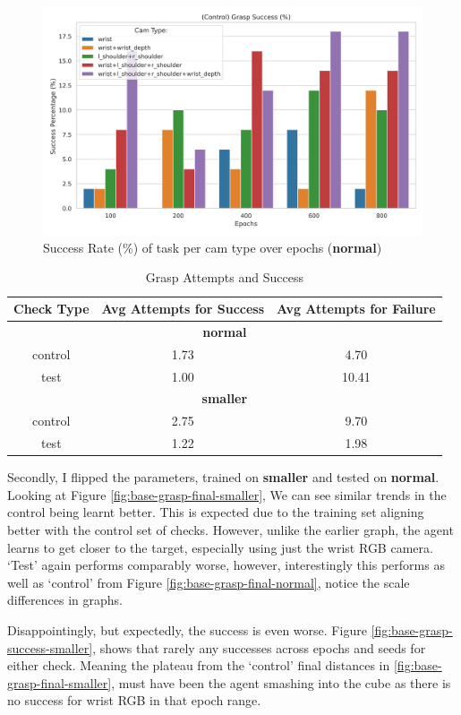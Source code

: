 \begin{figure}[H]
  \centering
  \includegraphics[width=0.4\linewidth]{assets/evaluation/baseline/base-grasp-control-success-cams-epochs.png}
  \caption{Success Rate (\%) of task per cam type over epochs (\textbf{normal})}\label{fig:base-grasp-control-success-normal}
\end{figure}

\begin{table}[ht]
\centering
  \begin{tabular}{||c c c||}
  \hline
  Check Type & Avg Attempts for Success & Avg Attempts for Failure\\
  \hline
  \hline
  \multicolumn{3}{||c||}{\textbf{normal}} \\
  control & 1.73 & 4.70 \\
  test    & 1.00 & 10.41 \\
  \hline
  \multicolumn{3}{||c||}{\textbf{smaller}} \\
  control & 2.75 & 9.70 \\
  test    & 1.22 & 1.98 \\
  \hline
  \end{tabular}\caption{Grasp Attempts and Success}\label{tab:baseline-grasp-attempts}
\end{table}

Secondly, I flipped the parameters, trained on \textbf{smaller} and tested on \textbf{normal}. Looking at Figure \ref{fig:base-grasp-final-smaller}, We can see similar trends in the control being learnt better. This is expected due to the training set aligning better with the control set of checks. However, unlike the earlier graph, the agent learns to get closer to the target, especially using just the wrist RGB camera. `Test' again performs comparably worse, however, interestingly this performs as well as `control' from Figure \ref{fig:base-grasp-final-normal}, notice the scale differences in graphs. 

Disappointingly, but expectedly, the success is even worse. Figure \ref{fig:base-grasp-success-smaller}, shows that rarely any successes across epochs and seeds for either check. Meaning the plateau from the `control' final distances in \ref{fig:base-grasp-final-smaller}, must have been the agent smashing into the cube as there is no success for wrist RGB in that epoch range. 

